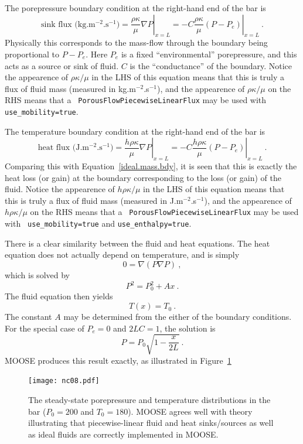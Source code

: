 The porepressure boundary condition
at the right-hand end of the bar is
\begin{equation}
\mbox{sink flux (kg.m$^{-2}$.s$^{-1}$)} =
\left. \frac{\rho\kappa}{\mu}\nabla P \right|_{x=L} =
\left. -C\frac{\rho\kappa}{\mu} (P - P_{e}) \right|_{x=L} \ .
\label{ideal.mass.bdy}
\end{equation}
Physically this corresponds to the mass-flow through the boundary
being proportional to $P-P_{e}$.  Here $P_{e}$ is a fixed
``environmental'' porepressure, and this acts as a source or sink of
fluid.  $C$ is the ``conductance'' of the boundary.  Notice the
appearence of $\rho \kappa/\mu$ in the LHS of this equation means that
this is truly a flux of fluid mass (measured in kg.m$^{-2}$.s$^{-1}$),
and the appearence of $\rho\kappa/\mu$ on the RHS means that a {\tt
  PorousFlowPiecewiseLinearFlux} may be used with {\tt
  use\_mobility=true}.

The temperature boundary condition
at the right-hand end of the bar is
\begin{equation}
\mbox{heat flux (J.m$^{-2}$.s$^{-1}$)} =
\left. \frac{h\rho\kappa}{\mu}\nabla P \right|_{x=L} =
\left. -C\frac{h\rho\kappa}{\mu} (P - P_{e}) \right|_{x=L} \ .
\end{equation}
Comparing this with Equation~\ref{ideal.mass.bdy}, it is seen that
this is exactly the heat loss (or gain) at the boundary corresponding
to the loss (or gain) of the fluid.  Notice the appearence of $h\rho
\kappa/\mu$ in the LHS of this equation means that this is truly a
flux of fluid mass (measured in J.m$^{-2}$.s$^{-1}$), and the
appearence of $h\rho\kappa/\mu$ on the RHS means that a {\tt
  PorousFlowPiecewiseLinearFlux} may be used with {\tt
  use\_mobility=true} and {\tt use\_enthalpy=true}.

There is a clear similarity between the fluid and heat equations.  The
heat equation does not actually depend on temperature, and is simply
\begin{equation}
0 = \nabla (P\nabla P) \ ,
\end{equation}
which is solved by
\begin{equation}
P^{2} = P_{0}^{2} + Ax \ .
\end{equation}
The fluid equation then yields
\begin{equation}
T(x) = T_{0} \ .
\end{equation}
The constant $A$ may be determined from the either of the boundary
conditions.  For the special case of $P_{e}=0$ and $2LC=1$, the
solution is
\begin{equation}
P = P_{0} \sqrt{1 - \frac{x}{2L}} \ .
\end{equation}
MOOSE produces this result exactly, as illustrated in Figure~\ref{nc08.fig}

\begin{figure}[htb]
\begin{center}
\texttt{[image: nc08.pdf]}
\caption{The steady-state porepressure and temperature distributions
  in the bar ($P_{0}=200$ and $T_{0}=180$).  MOOSE agrees well with
  theory illustrating that piecewise-linear fluid and heat
  sinks/sources as well as ideal fluids are correctly implemented in
  MOOSE.}
\label{nc08.fig}
\end{center}
\end{figure}
